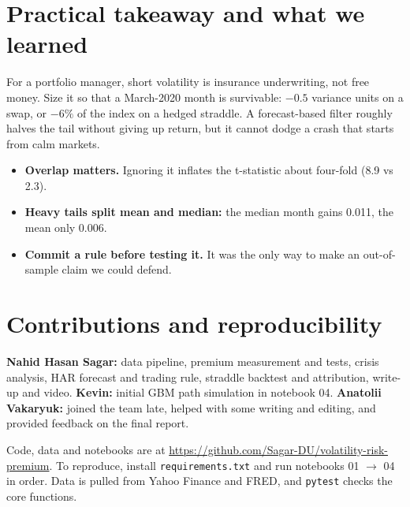 \documentclass[10pt]{article}
\begin{document}
\section*{Practical takeaway and what we learned}
For a portfolio manager, short volatility is insurance underwriting, not free money. Size it so that a March-2020 month is survivable: $-0.5$ variance units on a swap, or $-6\%$ of the index on a hedged straddle. A forecast-based filter roughly halves the tail without giving up return, but it cannot dodge a crash that starts from calm markets.
\begin{itemize}
  \item \textbf{Overlap matters.} Ignoring it inflates the t-statistic about four-fold (8.9 vs 2.3).
  \item \textbf{Heavy tails split mean and median:} the median month gains 0.011, the mean only 0.006.
  \item \textbf{Commit a rule before testing it.} It was the only way to make an out-of-sample claim we could defend.
\end{itemize}

\section*{Contributions and reproducibility}
\textbf{Nahid Hasan Sagar:} data pipeline, premium measurement and tests, crisis analysis, HAR forecast and trading rule, straddle backtest and attribution, write-up and video.
\textbf{Kevin:} initial GBM path simulation in notebook 04. %
\textbf{Anatolii Vakaryuk:} joined the team late, helped with some writing and editing, and provided feedback on the final report.

Code, data and notebooks are at \url{https://github.com/Sagar-DU/volatility-risk-premium}. To reproduce, install \texttt{requirements.txt} and run notebooks 01 $\to$ 04 in order. Data is pulled from Yahoo Finance and FRED, and \texttt{pytest} checks the core functions.
\end{document}
